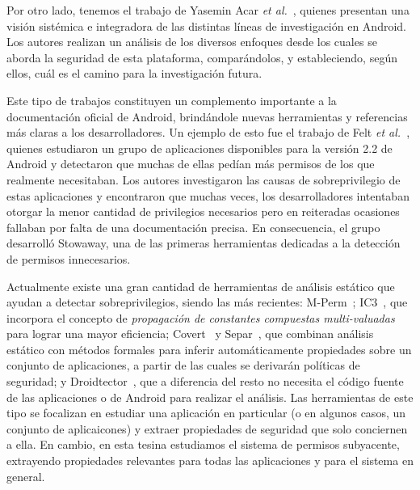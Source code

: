Por otro lado, tenemos el trabajo de Yasemin Acar \textit{et al.}~\cite{sok},
quienes presentan una visión sistémica e integradora de las distintas líneas de
investigación en Android. Los autores realizan un análisis de los diversos
enfoques desde los cuales se aborda la seguridad de esta plataforma,
comparándolos, y estableciendo, según ellos, cuál es el camino para la
investigación futura.

Este tipo de trabajos constituyen un complemento importante a la documentación
oficial de Android, brindándole nuevas herramientas y referencias más claras a
los desarrolladores. Un ejemplo de esto fue el trabajo de Felt \textit{et
al.}~\cite{felt}, quienes estudiaron un grupo de aplicaciones disponibles para
la versión 2.2 de Android y detectaron que muchas de ellas pedían más permisos
de los que realmente necesitaban. Los autores investigaron las causas de
sobreprivilegio de estas aplicaciones y encontraron que muchas veces, los
desarrolladores intentaban otorgar la menor cantidad de privilegios necesarios
pero en reiteradas ocasiones fallaban por falta de una documentación precisa. En
consecuencia, el grupo desarrolló Stowaway, una de las primeras herramientas
dedicadas a la detección de permisos innecesarios.

Actualmente existe una gran cantidad de herramientas de análisis estático que
ayudan a detectar sobreprivilegios, siendo las más recientes:
M-Perm~\cite{mperm}; IC3~\cite{ic3}, que incorpora el concepto de
\textit{propagación de constantes compuestas multi-valuadas} para lograr una
mayor eficiencia; Covert~\cite{covert} y Separ~\cite{separ}, que combinan
análisis estático con métodos formales para inferir automáticamente propiedades
sobre un conjunto de aplicaciones, a partir de las cuales se derivarán políticas
de seguridad; y Droidtector~\cite{droidtector}, que a diferencia del resto no
necesita el código fuente de las aplicaciones o de Android para realizar el análisis. Las herramientas de
este tipo se focalizan en estudiar una aplicación en particular (o en algunos
casos, un conjunto de aplicaicones) y extraer propiedades de seguridad que solo
conciernen a ella. En cambio, en esta tesina estudiamos el sistema de permisos
subyacente, extrayendo propiedades relevantes para todas las aplicaciones y para
el sistema en general.


